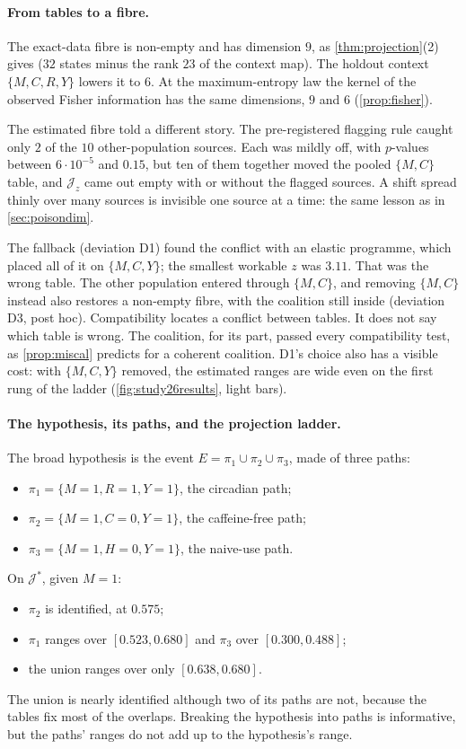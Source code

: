 \documentclass[11pt]{article}
\theoremstyle{definition}\newtheorem{definition}[theorem]{Definition}\newtheorem{remark}[theorem]{Remark}\newtheorem{example}[theorem]{Example}\newtheorem{problem}[theorem]{Open problem}\crefname{problem}{Problem}{Problems}
\begin{document}
\paragraph{From tables to a fibre.} The exact-data fibre is non-empty and has dimension $9$, as \cref{thm:projection}(2) gives ($32$ states minus the rank $23$ of the context map). The holdout context $\{M,C,R,Y\}$ lowers it to $6$. At the maximum-entropy law the kernel of the observed Fisher information has the same dimensions, $9$ and $6$ (\cref{prop:fisher}).

The estimated fibre told a different story. The pre-registered flagging rule caught only $2$ of the $10$ other-population sources. Each was mildly off, with $p$-values between $6\cdot10^{-5}$ and $0.15$, but ten of them together moved the pooled $\{M,C\}$ table, and $\mathcal J_z$ came out empty with or without the flagged sources. A shift spread thinly over many sources is invisible one source at a time: the same lesson as in \cref{sec:poisondim}.

The fallback (deviation D1) found the conflict with an elastic programme, which placed all of it on $\{M,C,Y\}$; the smallest workable $z$ was $3.11$. That was the wrong table. The other population entered through $\{M,C\}$, and removing $\{M,C\}$ instead also restores a non-empty fibre, with the coalition still inside (deviation D3, post hoc). Compatibility locates a conflict between tables. It does not say which table is wrong. The coalition, for its part, passed every compatibility test, as \cref{prop:miscal} predicts for a coherent coalition. D1's choice also has a visible cost: with $\{M,C,Y\}$ removed, the estimated ranges are wide even on the first rung of the ladder (\cref{fig:study26results}, light bars).

\paragraph{The hypothesis, its paths, and the projection ladder.} The broad hypothesis is the event $E=\pi_1\cup\pi_2\cup\pi_3$, made of three paths:
\begin{itemize}
\item $\pi_1=\{M{=}1,R{=}1,Y{=}1\}$, the circadian path;
\item $\pi_2=\{M{=}1,C{=}0,Y{=}1\}$, the caffeine-free path;
\item $\pi_3=\{M{=}1,H{=}0,Y{=}1\}$, the naive-use path.
\end{itemize}
On $\mathcal J^\ast$, given $M=1$:
\begin{itemize}
\item $\pi_2$ is identified, at $0.575$;
\item $\pi_1$ ranges over $[0.523,0.680]$ and $\pi_3$ over $[0.300,0.488]$;
\item the union ranges over only $[0.638,0.680]$.
\end{itemize}
The union is nearly identified although two of its paths are not, because the tables fix most of the overlaps. Breaking the hypothesis into paths is informative, but the paths' ranges do not add up to the hypothesis's range.
\end{document}
